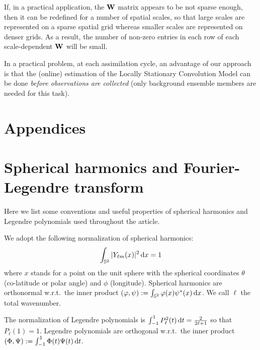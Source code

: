 \documentclass[12pt]{article}
\renewcommand{\S}{{\mathbb S}}
\renewcommand{\d}{{\rm d}}
\newcommand{\wrt}{w.r.t.\ }
\begin{document}
If, in a practical application, the ${\bf W}$ matrix appears to be not sparse enough,
then it can be redefined  for a number of spatial scales, so that
large scales are represented on a sparse spatial grid whereas smaller scales are 
represented on denser grids. As a result, the number of non-zero entries in each row of
each scale-dependent ${\bf W}$ will be small.



In a practical problem, at each assimilation cycle, 
an advantage of our approach is that
the (online) estimation of the Locally Stationary Convolution Model can be done {\em before observations are 
collected} (only background ensemble members are needed for this task).



\section*{Appendices}
%

\appendix



\section{Spherical harmonics and Fourier-Legendre transform}
\label{app_Ymn}




Here we list some conventions and useful properties of spherical harmonics and Legendre polynomials
used throughout the article.

We adopt the following normalization of spherical harmonics:
%
\begin {equation}
\label{Ylm}
\int_{\S^2} |Y_{\ell m}(x)|^2 \,\d x = 1
\end {equation}
%
where $x$ stands for a point on the unit sphere with the spherical coordinates  $\theta$ (co-latitude  or polar angle) 
and $\phi$ (longitude).
Spherical harmonics are orthonormal \wrt the inner product 
$(\varphi,\psi) := \int_{\S^2} \varphi(x) \psi^*(x)  \,\d x$.
We call $\ell$ the total wavenumber.%



The normalization of  Legendre polynomials is 
$
\int_{-1}^1 P^2_\ell(t) \,\d t = \frac{2}{2\ell +1}
$
so that $P_\ell(1)=1$.
Legendre polynomials are orthogonal \wrt the inner product 
$(\Phi,\Psi) := \int_{-1}^1 \Phi(t) \Psi(t)  \,\d t$.
\end{document}
